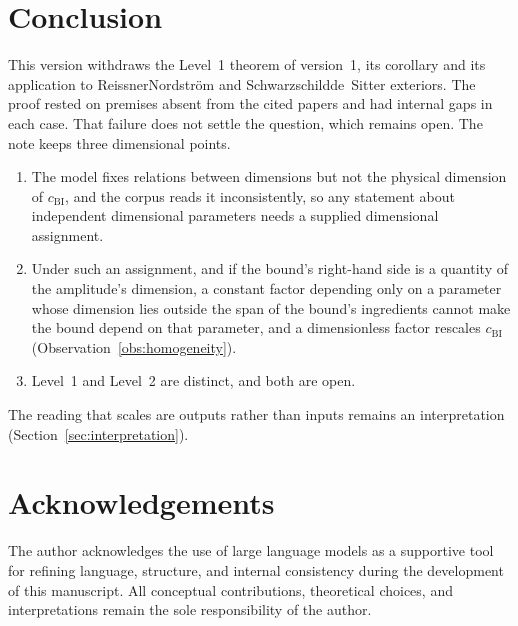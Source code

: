 \documentclass[11pt,a4paper]{article}
\begin{document}
  \section{Conclusion}
  \label{sec:conclusion}

    This version withdraws the Level~1 theorem of version~1, its corollary and its application to
    Reissner\textendash Nordstr\"om and Schwarzschild\textendash de~Sitter exteriors.
    The proof rested on premises absent from the cited papers and had internal gaps in each case.
    That failure does not settle the question, which remains open.
    The note keeps three dimensional points.
    \begin{enumerate}[(1)]
      \item The model fixes relations between dimensions but not the physical dimension of $c_{\mathrm{BI}}$, and
        the corpus reads it inconsistently, so any statement about independent dimensional parameters needs a
        supplied dimensional assignment.
      \item Under such an assignment, and if the bound's right-hand side is a quantity of the amplitude's
        dimension, a constant factor depending only on a parameter whose dimension lies outside the span of the
        bound's ingredients cannot make the bound depend on that parameter, and a dimensionless factor rescales
        $c_{\mathrm{BI}}$ (Observation~\ref{obs:homogeneity}).
      \item Level~1 and Level~2 are distinct, and both are open.
    \end{enumerate}
    The reading that scales are outputs rather than inputs remains an interpretation
    (Section~\ref{sec:interpretation}).

  \section*{Acknowledgements}

  The author acknowledges the use of large language models as a supportive tool for refining
  language, structure, and internal consistency during the development of this manuscript.
  All conceptual contributions, theoretical choices, and interpretations remain the sole
  responsibility of the author.

  
  
\end{document}
